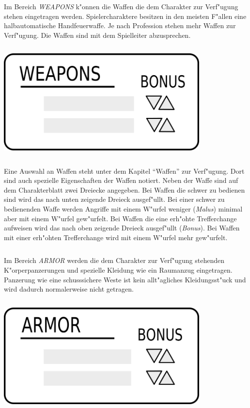 \begin{column}[l]{0.55}
    Im Bereich \emph{WEAPONS} k"onnen die Waffen die dem Charakter zur Verf"ugung stehen eingetragen werden. Spielercharaktere besitzen in den meisten F"allen eine halbautomatische Handfeuerwaffe. Je nach Profession stehen mehr Waffen zur Verf"ugung. Die Waffen sind mit dem Spielleiter abzusprechen. 
\end{column}
\begin{column}[r]{0.45}
    \centering
    \includegraphics[width=0.80\textwidth]{images/character_weapons}
\end{column}
\medskip

Eine Auswahl an Waffen steht unter dem Kapitel "`Waffen"' zur Verf"ugung. Dort sind auch spezielle Eigenschaften der Waffen notiert. Neben der Waffe sind auf dem Charakterblatt zwei Dreiecke angegeben. Bei Waffen die schwer zu bedienen sind wird das nach unten zeigende Dreieck ausgef"ullt. Bei einer schwer zu bedienenden Waffe werden Angriffe mit einem W"urfel weniger (\emph{Malus}) minimal aber mit einem W"urfel gew"urfelt. Bei Waffen die eine erh"ohte Trefferchange aufweisen wird das nach oben zeigende Dreieck ausgef"ullt (\emph{Bonus}). Bei Waffen mit einer erh"ohten Trefferchange wird mit einem W"urfel mehr gew"urfelt.

\begin{column}[l]{0.55}
    Im Bereich \emph{ARMOR} werden die dem Charakter zur Verf"ugung stehenden K"orperpanzerungen und spezielle Kleidung wie ein Raumanzug eingetragen. Panzerung wie eine schusssichere Weste ist kein allt"agliches Kleidungsst"uck und wird dadurch normalerweise nicht getragen. 
\end{column}
\begin{column}[r]{0.45}
    \centering
    \includegraphics[width=0.80\textwidth]{images/character_armor}
\end{column}
\medskip

